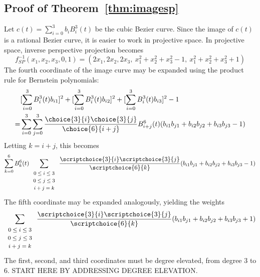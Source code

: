 \documentclass[12pt]{article}
\begin{document}
\subsection{Proof of Theorem~\ref{thm:imagesp}}

\prf
Let $c(t) = \sum_{i=0}^3 b_i B_i^3(t)$ be the cubic Bezier curve.
Since the image of $c(t)$ is a rational Bezier curve,
it is easier to work in projective space.
In projective space, inverse perspective projection becomes
\[
f^{-1}_{SP}(x_1,x_2,x_3,0,1) = (2x_1, 2x_2, 2x_3,\ x_1^2 + x_2^2 + x_3^2 - 1, 
                                \ x_1^2 + x_2^2 + x_3^2 + 1)
\]
The fourth coordinate of the image curve may be expanded using the product rule
for Bernstein polynomials:
\begin{eqnarray*}
& [\sum_{i=0}^3 B_i^3(t) b_{i1}]^2 + 
[\sum_{i=0}^3 B_i^3(t) b_{i2}]^2 + 
[\sum_{i=0}^3 B_i^3(t) b_{i3}]^2 - 1 \\
= & \sum_{i=0}^3 \sum_{j=0}^3 
	\frac{\choice{3}{i} \choice{3}{j}}{\choice{6}{i+j}}
       B^6_{i+j}(t) (b_{i1} b_{j1} + b_{i2} b_{j2} + b_{i3} b_{j3} - 1) 
\end{eqnarray*}
Letting $k=i+j$, this becomes
\[ \sum_{k=0}^6 B_k^6(t) 
	\sum_{\begin{array}{c}  \mbox{\footnotesize{$0 \leq i \leq 3$}} \\ 
	                        \mbox{\footnotesize{$0 \leq j \leq 3$}} \\ 
			        \mbox{\footnotesize{$i+j=k$}}
			     \end{array}} 
	\frac{\scriptchoice{3}{i} \scriptchoice{3}{j}}{\scriptchoice{6}{k}}
	(b_{i1} b_{j1} + b_{i2} b_{j2} + b_{i3} b_{j3} - 1) 
\]
The fifth coordinate may be expanded analogously, yielding the weights
\[
	\sum_{\begin{array}{c}  \mbox{\footnotesize{$0 \leq i \leq 3$}} \\ 
	                        \mbox{\footnotesize{$0 \leq j \leq 3$}} \\ 
			        \mbox{\footnotesize{$i+j=k$}}
			     \end{array}} 
	\frac{\scriptchoice{3}{i} \scriptchoice{3}{j}}{\scriptchoice{6}{k}}
	(b_{i1} b_{j1} + b_{i2} b_{j2} + b_{i3} b_{j3} + 1) 
\]
The first, second, and third coordinates must be degree elevated,
from degree 3 to 6.
START HERE BY ADDRESSING DEGREE ELEVATION.
\QED
\end{document}
